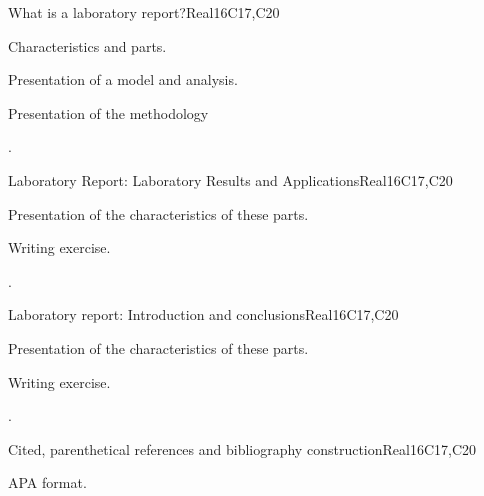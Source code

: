 \begin{syllabus}
\begin{unit}{What is a laboratory report?}{}{Real}{16}{C17,C20}
  \begin{topics}
      \item Characteristics and parts.
      \item Presentation of a model and analysis.
      \item Presentation of the methodology
  \end{topics}

  \begin{learningoutcomes}
   \item .%
  \end{learningoutcomes}
\end{unit}

\begin{unit}{Laboratory Report: Laboratory Results and Applications}{}{Real}{16}{C17,C20}
  \begin{topics}
      \item Presentation of the characteristics of these parts.
      \item Writing exercise.
  \end{topics}

  \begin{learningoutcomes}
   \item .%
  \end{learningoutcomes}
\end{unit}

\begin{unit}{Laboratory report: Introduction and conclusions}{}{Real}{16}{C17,C20}
  \begin{topics}
      \item Presentation of the characteristics of these parts.
      \item Writing exercise.
  \end{topics}

  \begin{learningoutcomes}
   \item .%
  \end{learningoutcomes}
\end{unit}

\begin{unit}{Cited, parenthetical references and bibliography construction}{}{Real}{16}{C17,C20}
  \begin{topics}
      \item APA format.
  \end{topics}


\end{unit}
\end{syllabus}
